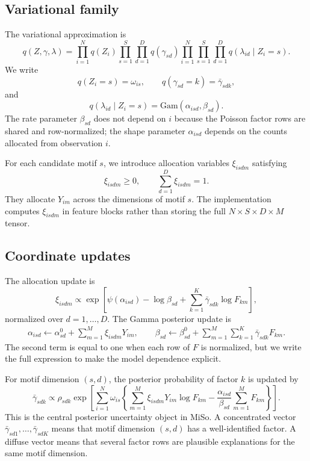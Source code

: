 \documentclass[11pt]{article}
\newcommand{\Gam}{\mathrm{Gam}}
\theoremstyle{plain}
\theoremstyle{definition}
\begin{document}
\subsection{Variational family}

The variational approximation is
\[
  q(Z,\gamma,\lambda)
  =
  \prod_{i=1}^N q(Z_i)
  \prod_{s=1}^S\prod_{d=1}^D q(\gamma_{sd})
  \prod_{i=1}^N\prod_{s=1}^S\prod_{d=1}^D
  q(\lambda_{id}\mid Z_i=s).
\]
We write
\[
  q(Z_i=s)=\omega_{is},
  \qquad
  q(\gamma_{sd}=k)=\bar{\gamma}_{sdk},
\]
and
\[
  q(\lambda_{id}\mid Z_i=s)
  =
  \Gam(\alpha_{isd},\beta_{sd}).
\]
The rate parameter $\beta_{sd}$ does not depend on $i$ because the Poisson
factor rows are shared and row-normalized; the shape parameter
$\alpha_{isd}$ depends on the counts allocated from observation $i$.

For each candidate motif $s$, we introduce allocation variables
$\xi_{isdm}$ satisfying
\[
  \xi_{isdm}\geq 0,
  \qquad
  \sum_{d=1}^D \xi_{isdm}=1.
\]
They allocate $Y_{im}$ across the dimensions of motif $s$. The implementation
computes $\xi_{isdm}$ in feature blocks rather than storing the full
$N\times S\times D\times M$ tensor.

\subsection{Coordinate updates}

The allocation update is
\begin{equation}
  \xi_{isdm}
  \propto
  \exp\left[
    \psi(\alpha_{isd})-\log\beta_{sd}
    +
    \sum_{k=1}^K \bar{\gamma}_{sdk}\log F_{km}
  \right],
  \label{eq:miso-xi-update}
\end{equation}
normalized over $d=1,\ldots,D$. The Gamma posterior update is
\begin{equation}
\begin{aligned}
  \alpha_{isd}
  \leftarrow
  \alpha_{sd}^0+\sum_{m=1}^M \xi_{isdm}Y_{im},
  \qquad
  \beta_{sd}
  \leftarrow
  \beta_{sd}^0
  +
  \sum_{m=1}^M\sum_{k=1}^K \bar{\gamma}_{sdk}F_{km}.
\end{aligned}
  \label{eq:miso-gamma-update}
\end{equation}
The second term is equal to one when each row of $F$ is normalized, but we
write the full expression to make the model dependence explicit.

For motif dimension $(s,d)$, the posterior probability of factor $k$ is updated by
\begin{equation}
  \bar{\gamma}_{sdk}
  \propto
  \rho_{sdk}
  \exp\left[
    \sum_{i=1}^N \omega_{is}
    \left\{
      \sum_{m=1}^M \xi_{isdm}Y_{im}\log F_{km}
      -
      \frac{\alpha_{isd}}{\beta_{sd}}\sum_{m=1}^M F_{km}
    \right\}
  \right].
  \label{eq:miso-selection-update}
\end{equation}
This is the central posterior uncertainty object in MiSo. A concentrated
vector $\bar{\gamma}_{sd1},\ldots,\bar{\gamma}_{sdK}$ means that motif dimension
$(s,d)$ has a well-identified factor. A diffuse vector means that several
factor rows are plausible explanations for the same motif dimension.
\end{document}
